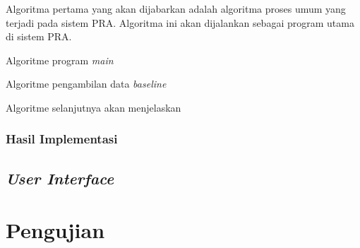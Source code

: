Algoritma pertama yang akan dijabarkan adalah algoritma proses umum yang terjadi pada sistem PRA. Algoritma ini akan dijalankan sebagai program utama di sistem PRA.
\begin{algorithm}[hbt!]
	
	
	
	
	\caption{Algoritme program \textit{main}}\label{alg:main}
\end{algorithm}

\begin{algorithm}[hbt!]
	
	\caption{Algoritme pengambilan data \textit{baseline}}\label{alg:baseline-ret}
\end{algorithm}

Algoritme selanjutnya akan menjelaskan 








\subsubsection{Hasil Implementasi}

\subsection{\textit{User Interface}}


\section{Pengujian}
